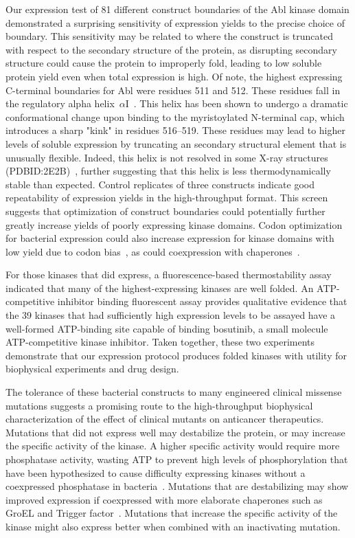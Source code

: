 \documentclass[phd,tocprelim]{cornell}
\begin{document}
Our expression test of 81 different construct boundaries of the Abl kinase domain demonstrated a surprising sensitivity of expression yields to the precise choice of boundary. 
This sensitivity may be related to where the construct is truncated with respect to the secondary structure of the protein, as disrupting secondary structure could cause the protein to improperly fold, leading to low soluble protein yield even when total expression is high. 
Of note, the highest expressing C-terminal boundaries for Abl were residues 511 and 512. 
These residues fall in the regulatory alpha helix~$\alpha$I~\citep{Nagar:2003tu}. 
This helix has been shown to undergo a dramatic conformational change upon binding to the myristoylated N-terminal cap, which introduces a sharp "kink" in residues 516--519. 
These residues may lead to higher levels of soluble expression by truncating an secondary structural element that is unusually flexible. 
Indeed, this helix is not resolved in some X-ray structures (PDBID:2E2B)~\citep{Horio:2007wo}, further suggesting that this helix is less thermodynamically stable than expected. 
Control replicates of three constructs indicate good repeatability of expression yields in the high-throughput format. 
This screen suggests that optimization of construct boundaries could potentially further greatly increase yields of poorly expressing kinase domains. 
Codon optimization for bacterial expression could also increase expression for kinase domains with low yield due to codon bias~\citep{SORENSEN2005113}, as could coexpression with chaperones~\citep{Haacke:ProteinExpr.Purif.:2009}. 

For those kinases that did express, a fluorescence-based thermostability assay indicated that many of the highest-expressing kinases are well folded. 
An ATP-competitive inhibitor binding fluorescent assay provides qualitative evidence that the 39 kinases that had sufficiently high expression levels to be assayed have a well-formed ATP-binding site capable of binding bosutinib, a small molecule ATP-competitive kinase inhibitor. 
Taken together, these two experiments demonstrate that our expression protocol produces folded kinases with utility for biophysical experiments and drug design.  

The tolerance of these bacterial constructs to many engineered clinical missense mutations suggests a promising route to the high-throughput biophysical characterization of the effect of clinical mutants on anticancer therapeutics. 
Mutations that did not express well may destabilize the protein, or may increase the specific activity of the kinase. 
A higher specific activity would require more phosphatase activity, wasting ATP to prevent high levels of phosphorylation that have been hypothesized to cause difficulty expressing kinases without a coexpressed phosphatase in bacteria~\citep{seeliger:2005:protein-sci:kinase-expression}. 
Mutations that are destabilizing may show improved expression if coexpressed with more elaborate chaperones such as GroEL and Trigger factor~\citep{Haacke:ProteinExpr.Purif.:2009}.
Mutations that increase the specific activity of the kinase might also express better when combined with an inactivating mutation.  
\end{document}
